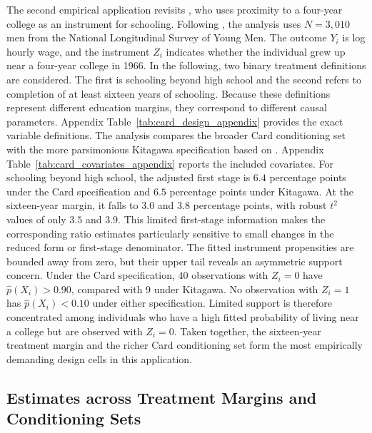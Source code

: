 \documentclass[12pt, a4paper, oneside]{article}
\theoremstyle{plain}
\theoremstyle{definition}
\begin{document}
The second empirical application revisits \citet{card1993using}, who uses proximity to a four-year college as an instrument for schooling. Following \citet{sloczynski2025abadie}, the analysis uses \(N=3{,}010\) men from the National Longitudinal Survey of Young Men. The outcome \(Y_i\) is log hourly wage, and the instrument \(Z_i\) indicates whether the individual grew up near a four-year college in 1966.
In the following, two binary treatment definitions are considered. The first is schooling beyond high school and the second refers to completion of at least sixteen years of schooling.
Because these definitions represent different education margins, they correspond to different causal parameters. Appendix Table~\ref{tab:card_design_appendix} provides the exact variable definitions.
The analysis compares the broader Card conditioning set with the more parsimonious Kitagawa specification based on \citet{kitagawa2015test}. Appendix Table~\ref{tab:card_covariates_appendix} reports the included covariates.
For schooling beyond high school, the adjusted first stage is \(6.4\) percentage points under the Card specification and \(6.5\) percentage points under Kitagawa. At the sixteen-year margin, it falls to \(3.0\) and \(3.8\) percentage points, with robust \(t^2\) values of only \(3.5\) and \(3.9\). This limited first-stage information makes the corresponding ratio estimates particularly sensitive to small changes in the reduced form or first-stage denominator.
The fitted instrument propensities are bounded away from zero, but their upper tail reveals an asymmetric support concern. Under the Card specification, \(40\) observations with \(Z_i=0\) have \(\hat p(X_i)>0.90\), compared with \(9\) under Kitagawa. No observation with \(Z_i=1\) has \(\hat p(X_i)<0.10\) under either specification. Limited support is therefore concentrated among individuals who have a high fitted probability of living near a college but are observed with \(Z_i=0\). Taken together, the sixteen-year treatment margin and the richer Card conditioning set form the most empirically demanding design cells in this application.



\subsection{Estimates across Treatment Margins and Conditioning Sets}
\label{subsec:card_estimates}
\end{document}
